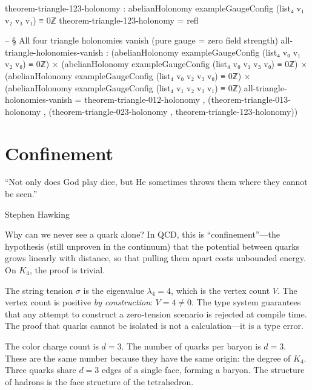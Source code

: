 \documentclass[11pt,a4paper]{book}
\begin{document}
\begin{code}
  theorem-triangle-123-holonomy :
    abelianHolonomy exampleGaugeConfig (list₄ v₁ v₂ v₃ v₁) ≡ 0ℤ
  theorem-triangle-123-holonomy = refl

-- § All four triangle holonomies vanish (pure gauge = zero field strength)
all-triangle-holonomies-vanish :
  (abelianHolonomy exampleGaugeConfig (list₄ v₀ v₁ v₂ v₀) ≡ 0ℤ) ×
  (abelianHolonomy exampleGaugeConfig (list₄ v₀ v₁ v₃ v₀) ≡ 0ℤ) ×
  (abelianHolonomy exampleGaugeConfig (list₄ v₀ v₂ v₃ v₀) ≡ 0ℤ) ×
  (abelianHolonomy exampleGaugeConfig (list₄ v₁ v₂ v₃ v₁) ≡ 0ℤ)
all-triangle-holonomies-vanish =
  theorem-triangle-012-holonomy ,
  (theorem-triangle-013-holonomy ,
  (theorem-triangle-023-holonomy ,
  theorem-triangle-123-holonomy))
\end{code}

\chapter{Confinement}
\label{ch:confinement}

\epigraph{``Not only does God play dice, but He sometimes throws them where they cannot be seen.''}{Stephen Hawking}

Why can we never see a quark alone? In QCD, this is ``confinement''---the hypothesis (still unproven in the continuum) that the potential between quarks grows linearly with distance, so that pulling them apart costs unbounded energy. On $K_4$, the proof is trivial.

The string tension $\sigma$ is the eigenvalue $\lambda_4 = 4$, which is the vertex count $V$. The vertex count is positive \emph{by construction}: $V = 4 \neq 0$. The type system guarantees that any attempt to construct a zero-tension scenario is rejected at compile time. The proof that quarks cannot be isolated is not a calculation---it is a type error.

The color charge count is $d = 3$. The number of quarks per baryon is $d = 3$. These are the same number because they have the same origin: the degree of $K_4$. Three quarks share $d = 3$ edges of a single face, forming a baryon. The structure of hadrons is the face structure of the tetrahedron.
\end{document}
